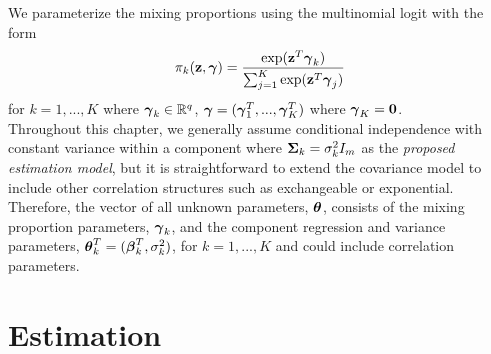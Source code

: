 We parameterize the mixing proportions using the multinomial logit with the form
$$\pi_{k}(\mathbf z,\boldsymbol\gamma)=\frac{\exp(\mathbf z^{T}\boldsymbol\gamma_{k})}{\sum_{j=1}^{K}\exp(\mathbf z^{T}\boldsymbol\gamma_{j})}$$ 
for $k=1,...,K$ where $\boldsymbol \gamma_{k}\in\mathbb{R}^{q}$, $\boldsymbol\gamma = (\boldsymbol\gamma_1^T,...,\boldsymbol\gamma_K^T)$ where $\boldsymbol\gamma_{K}=\mathbf 0$.\\

Throughout this chapter, we generally assume conditional independence with constant variance within a component where $\mathbf\Sigma_{k}=\sigma^{2}_{k}I_{m}$ as the {\em proposed estimation model}, but it is straightforward to extend the covariance model to include other correlation structures such as exchangeable or exponential. Therefore, the vector of all unknown parameters, $\boldsymbol\theta$, consists of the mixing proportion parameters, $\boldsymbol\gamma_{k}$, and the component regression and variance parameters, $\boldsymbol\theta^{T}_{k}=(\boldsymbol\beta^{T}_{k},\sigma^{2}_{k})$, for $k=1,...,K$ and could include correlation parameters.  
\section{Estimation}

